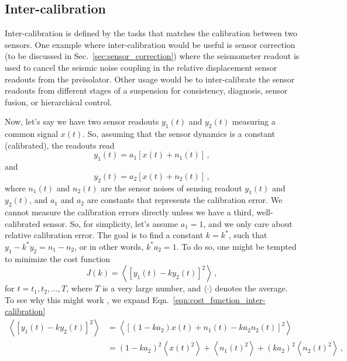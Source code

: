 \subsection{Inter-calibration}
Inter-calibration is defined by the tasks that matches the calibration between two sensors.
One example where inter-calibration would be useful is sensor correction (to be discussed in Sec.~\ref{sec:sensor_correction}) where the seismometer readout is used to cancel the seismic noise coupling in the relative displacement sensor readouts from the preisolator.
Other usage would be to inter-calibrate the sensor readouts from different stages of a suspension for consistency, diagnosis, sensor fusion, or hierarchical control.

Now, let's say we have two sensor readouts $y_1(t)$ and $y_2(t)$ measuring a common signal $x(t)$.
So, assuming that the sensor dynamics is a constant (calibrated), the readouts read
\begin{equation}
	y_1(t) = a_1\left[x(t) + n_1(t)\right]\,,
\end{equation}
and
\begin{equation}
	y_2(t) = a_2\left[x(t) + n_2(t)\right]\,,
\end{equation}
where $n_1(t)$ and $n_2(t)$ are the sensor noises of sensing readout $y_1(t)$ and $y_2(t)$, and $a_1$ and $a_2$ are constants that represents the calibration error.
We cannot measure the calibration errors directly unless we have a third, well-calibrated sensor.
So, for simplicity, let's assume $a_1=1$, and we only care about relative calibration error.
The goal is to find a constant $k=k^*$, such that $y_1 - k^* y_2 = n_1-n_2$, or in other words, $k^* a_2 = 1$.
To do so, one might be tempted to minimize the cost function
\begin{equation}
	J(k) = \left\langle \left[ y_1(t)-ky_2(t) \right]^2\right\rangle\,,
	\label{eqn:cost_function_inter-calibration}
\end{equation}
for $t={t_1,t_2,\dots,T}$, where $T$ is a very large number, and $\langle \cdot \rangle$ denotes the average.
To see why this might work , we expand Eqn.~\eqref{eqn:cost_function_inter-calibration}
\begin{equation}
	\begin{split}
		\left\langle \left[ y_1(t)-ky_2(t) \right]^2\right\rangle &= \left\langle \left[(1-ka_2)x(t) + n_1(t) - ka_2n_2(t) \right]^2 \right\rangle \\
		&= \left(1-ka_2\right)^2\left\langle x(t)^2 \right\rangle + \left\langle n_1(t)^2 \right\rangle + \left(ka_2\right)^2\left\langle n_2(t)^2 \right\rangle \,,
	\end{split}
	\label{eqn:cost_function_inter-calibration_expanded}
\end{equation}
